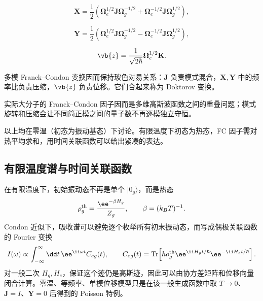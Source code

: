 \[
\mathbf X
=\frac12
\left(
\boldsymbol\Omega_e^{1/2}\mathbf J\boldsymbol\Omega_g^{-1/2}
+
\boldsymbol\Omega_e^{-1/2}\mathbf J\boldsymbol\Omega_g^{1/2}
\right),
\]

\[
\mathbf Y
=\frac12
\left(
\boldsymbol\Omega_e^{1/2}\mathbf J\boldsymbol\Omega_g^{-1/2}
-
\boldsymbol\Omega_e^{-1/2}\mathbf J\boldsymbol\Omega_g^{1/2}
\right),
\]

\[
\vb{z}
=\frac1{\sqrt{2\hbar}}
\boldsymbol\Omega_e^{1/2}\mathbf K.
\]

多模 Franck--Condon 变换因而保持玻色对易关系：\(\mathbf J\) 负责模式混合，\(\mathbf X,\mathbf Y\) 中的频率比负责压缩，\(\vb{z}\) 负责位移。它们合起来称为 Doktorov 变换。

实际大分子的 Franck--Condon 因子因而是多维高斯波函数之间的重叠问题；模式旋转和压缩会让不同简正模之间的量子数不再逐模独立守恒。

以上均在零温（初态为振动基态）下讨论。有限温度下初态为热态，FC 因子需对热平均求和，用时间关联函数可以给出紧凑的表达。

\subsection{有限温度谱与时间关联函数}

在有限温度下，初始振动态不再是单个 $|0_g\rangle$，而是热态
\[
\rho_g^{\rm th}=\frac{\ee^{-\beta H_g}}{Z_g},
\qquad \beta=(k_BT)^{-1}.
\]
Condon 近似下，吸收谱可以避免逐个枚举所有初末振动态，而写成偶极关联函数的 Fourier 变换
\begin{equation}
I(\omega)\propto
\int_{-\infty}^{\infty}\dd t\,
\ee^{\ii\omega t}
C_{eg}(t),
\qquad
C_{eg}(t)=\operatorname{Tr}\!\left[
ho_g^{\rm th}
\ee^{\ii H_gt/\hbar}\ee^{-\ii H_et/\hbar}\right].
\label{eq:franck-condon-thermal-correlation}
\end{equation}
对一般二次 $H_g,H_e$，保证这个迹仍是高斯迹，因此可以由协方差矩阵和位移向量闭合计算。零温、等频率、单模位移模型只是在该一般生成函数中取 $T\to0$、$\mathbf J=I$、$\mathbf Y=0$ 后得到的 Poisson 特例。

